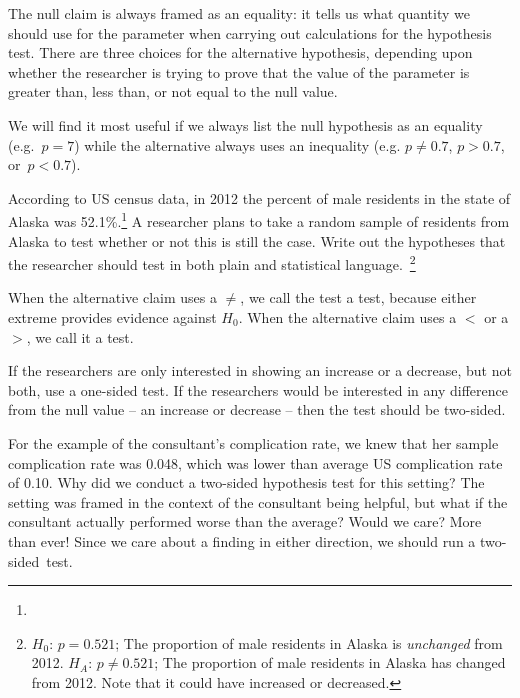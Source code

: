 The null claim is always framed as an equality: it tells us what quantity we should use for the parameter when carrying out calculations for the hypothesis test. There are three choices for the alternative hypothesis, depending upon whether the researcher is trying to prove that the value of the parameter is greater than, less than, or not equal to the null value.

\begin{tipBox}{
We will find it most useful if we always list the null hypothesis as an equality (e.g.~$p = 7$) while the alternative always uses an inequality (e.g. $p \neq 0.7$, $p>0.7$, or~$p<0.7$).}
\end{tipBox}

\begin{exercise}
According to US census data, in 2012 the percent of male residents in the state of Alaska was 52.1\%.\footnote{} A researcher plans to take a random sample of residents from Alaska to test whether or not this is still the case. Write out the hypotheses that the researcher should test in both plain and statistical language.~\footnote{$H_0$: $p=0.521$; The proportion of male residents in Alaska is \emph{unchanged} from 2012. $H_A$: $p \neq 0.521$; The proportion of male residents in Alaska has changed from 2012. Note that it could have increased or decreased.}
\end{exercise}

When the alternative claim uses a $\neq$, we call the test a  test, because either extreme provides evidence against $H_0$. When the alternative claim uses a $<$ or a $>$, we call it a  test.

\begin{tipBox}{
If the researchers are only interested in showing an increase or a decrease, but not both, use a one-sided test. If the researchers would be interested in any difference from the null value -- an increase or decrease -- then the test should be two-sided.\vspace{0.5mm}}
\end{tipBox}

\begin{example}{For the example of the consultant's complication rate, we knew that her sample complication rate was 0.048, which was lower than average US complication rate of 0.10. Why did we conduct a two-sided hypothesis test for this setting?}
The setting was framed in the context of the consultant being helpful, but what if the consultant actually performed worse than the average? Would we care? More than ever! Since we care about a finding in either direction, we should run a two-sided~test.
\end{example}

